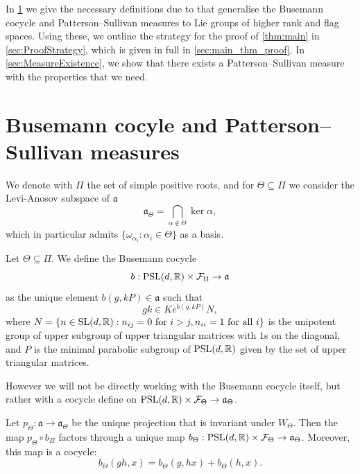 \documentclass{report}
\begin{document}
In \cref{sec:busemann} we give the necessary definitions due to \cite{quint2002mesures} that generalise the Busemann cocycle and Patterson--Sullivan measures to Lie groups of higher rank and flag spaces.
Using these, we outline the strategy for the proof of \cref{thm:main} in \cref{sec:ProofStrategy}, which is given in full in \cref{sec:main_thm_proof}.
In \cref{sec:MeasureExistence}, we show that there exists a Patterson--Sullivan measure with the properties that we need. 

\section{Busemann cocyle and Patterson--Sullivan measures}\label{sec:busemann}
We denote with $\Pi$ the set of simple positive roots, and for $\Theta \subseteq \Pi$ we consider the Levi-Anosov subspace of $\mathfrak a$
\[
    \mathfrak a_\Theta = \bigcap_{\alpha \notin \Theta} \ker \alpha,
\]
which in particular admits $\{ \omega_{\alpha_i} : \alpha_i \in \Theta \}$ as a basis.

\begin{definition}
    Let $\Theta \subseteq \Pi$. We define the Busemann cocycle
    \[
    b : \operatorname{{\mathrm{PSL}}}(d, \mathbb R) \times \mathcal F_\Pi \to \mathfrak a
    \]
    as the unique element $b(g, k P) \in \mathfrak a$ such that
    \[
    g k \in K e^{b(g, k P)} N,
    \]
    where $N = \{ n \in \operatorname{{\mathrm{SL}}}(d, \mathbb R) : n_{ij} = 0 \text{ for } i > j, n_{ii} = 1 \text{ for all } i \}$ is the unipotent group of upper subgroup of upper triangular matrices with $1$s on the diagonal, and $P$ is the minimal parabolic subgroup of $\operatorname{{\mathrm{PSL}}}(d, \mathbb R)$ given by the set of upper triangular matrices.
\end{definition}
However we will not be directly working with the Busemann cocycle itself, but rather with a cocycle define on $\operatorname{{\mathrm{PSL}}}(d, \mathbb R) \times \mathcal F_\Theta \to \mathfrak a_\Theta$.
\begin{lemma}
    Let $p_\Theta: \mathfrak a \to \mathfrak a_\Theta$ be the unique projection that is invariant under $W_\Theta$.
    Then the map $p_\Theta \circ b_\Pi$ factors through a unique map $b_\Theta: \operatorname{{\mathrm{PSL}}}(d, \mathbb R) \times \mathcal F_\Theta \to \mathfrak a_\Theta$.
    Moreover, this map is a cocycle:
    \[
    b_\Theta(gh, x) = b_\Theta(g, hx) + b_\Theta(h,x).
    \]
\end{lemma}
\end{document}
